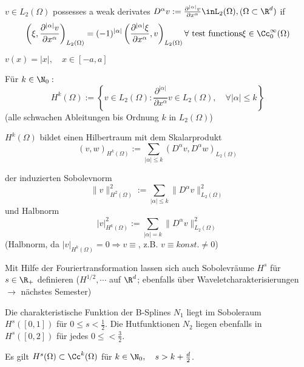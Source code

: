\begin{definition}
    $v\in L_2(\Omega)$ possesses a weak derivates $D^{\alpha}v:= \frac{\partial^{|\alpha|}v}{\partial x^\alpha} \inL_2(\Omega), (\Omega\subset\R^d)$ if 
    \begin{equation}
        \left( \xi, \frac{\partial^{|\alpha|}v}{\partial x^\alpha} \right)_{L_2(\Omega)} = (-1)^{|\alpha|}\left( \frac{\partial^{|\alpha|}\xi}{\partial x^\alpha},v \right)_{L_2(\Omega)} \forall \text{ test functions} \xi\in \Cc^\infty_0(\Omega)
        \label{}
    \end{equation}
\end{definition}

\begin{beispiel}
    $v(x)=|x|, \quad x\in [-a,a]$
\end{beispiel}

Für $k\in\N_0:$
\[
    H^k(\Omega) := \left\{ v\in L_2(\Omega): \frac{\partial^{|\alpha|}}{\partial x^\alpha}v \in L_2(\Omega),\quad \forall |\alpha|\leq k \right\}
\]
(alle schwachen Ableitungen bis Ordnung $k$ in $L_2(\Omega)$)

\begin{satz}
    $H^k(\Omega)$ bildet einen Hilbertraum mit dem Skalarprodukt 
    \[
        (v,w)_{H^k(\Omega)} := \sum_{|\alpha|\leq k}\left( D^\alpha v, D^\alpha w\right)_{L_2(\Omega)}
    \]

    der induzierten Sobolevnorm
    \[
        \|v\|^2_{H^2(\Omega)} := \sum_{|\alpha|\leq k} \|D^\alpha v\|^2_{L_2(\Omega)}
    \]
    und Halbnorm
    \[
        |v|^2_{H^k(\Omega)} := \sum_{|\alpha|=k} \|D^\alpha v\|^2_{L_2(\Omega)}
    \]
    (Halbnorm, da $|v|_{H^k(\Omega)}=0 \Rightarrow v\equiv$, z.B. $v\equiv konst. \neq 0$)
\end{satz}

Mit Hilfe der Fouriertransformation lassen sich auch Sobolevräume $H^s$ für $s\in\R_+$ definieren ($H^{1/2},\cdots$ auf $\R^d$; ebenfalls über Waveletcharakterisierungen $\to$ nächstes Semester)

\begin{beispiel}
    Die charakteristische Funktion der B-Splines $N_1$ liegt im Soboleraum $H^s([0,1])$ für $0\leq s<\frac{1}{2}$. Die Hutfunktionen $N_2$ liegen ebenfalls in $H^s([0,2])$ für jedes $0\leq < \frac{3}{2}$.
\end{beispiel}

\begin{lemma} %
    Es gilt $H^s(\Omega) \subset \Cc^k(\Omega)$ für $k\in\N_0, \quad s> k + \frac{d}{2}$.
    \label{}
\end{lemma}

